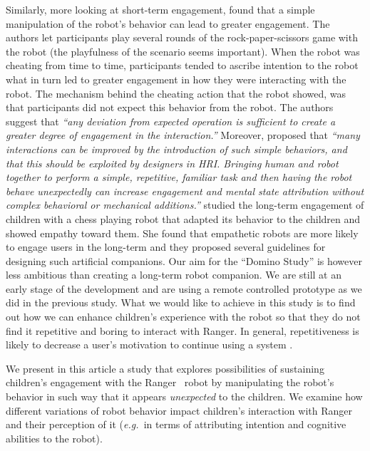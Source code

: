 \documentclass{sig-alternate}
\newcommand{\eg}{{\textit{e.g.~}}}
\begin{document}
Similarly, more looking at short-term engagement, \cite{short_no_2010} found
that a simple manipulation of the robot's behavior can lead to greater
engagement. The authors let participants play several rounds of the
rock-paper-scissors game with the robot (the playfulness of the scenario seems
important). When the robot was cheating from time to time, participants tended
to ascribe intention to the robot what in turn led to greater engagement in how
they were interacting with the robot. The mechanism behind the cheating action
that the robot showed, was that participants did not expect this behavior from
the robot. The authors suggest that \textit{``any deviation from expected
operation is sufficient to create a greater degree of engagement in the
interaction.''} Moreover, \cite[p.~225]{short_no_2010} proposed that
\textit{``many interactions can be improved by the introduction of such simple
behaviors, and that this should be exploited by designers in HRI. Bringing human
and robot together to perform a simple, repetitive, familiar task and then
having the robot behave unexpectedly can increase engagement and mental state
attribution without complex behavioral or mechanical additions.''}
\cite{leite_long-term_2013} studied the long-term engagement of children with a
chess playing robot that adapted its behavior to the children and showed empathy
toward them. She found that empathetic robots are more likely to engage users in
the long-term and they proposed several guidelines for designing such artificial
companions. Our aim for the ``Domino Study'' is however less ambitious than
creating a long-term robot companion. We are still at an early stage of the
development and are using a remote controlled prototype as we did in the
previous study. What we would like to achieve in this study is to find out how
we can enhance children's experience with the robot so that they do not find it
repetitive and boring to interact with Ranger. In general, repetitiveness is
likely to decrease a user's motivation to continue using a system
\cite{bickmore_establishing_2005}.

We present in this article a study that explores possibilities of sustaining
children's engagement with the Ranger~\cite{mondada2014ranger} robot by
manipulating the robot's behavior in such way that it appears
\textit{unexpected} to the children. We examine how different variations of
robot behavior impact children's interaction with Ranger and their perception of
it (\eg in terms of attributing intention and cognitive abilities to the robot).
\end{document}
